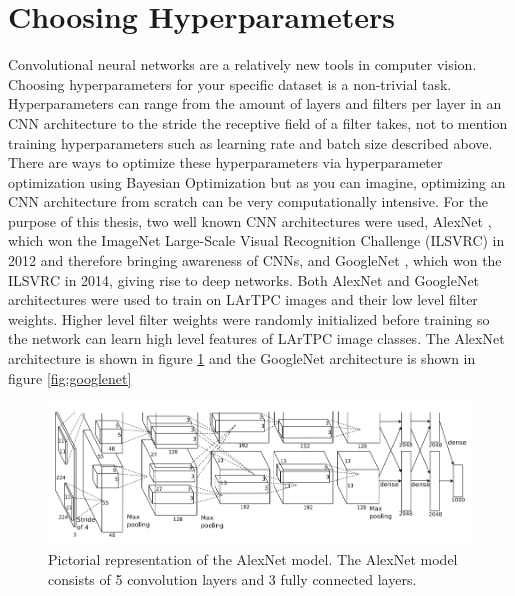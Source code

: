 \section{Choosing Hyperparameters}
Convolutional neural networks are a relatively new tools in computer vision. Choosing hyperparameters for your specific dataset is a non-trivial task. Hyperparameters can range from the amount of layers and filters per layer in an CNN architecture to the stride the receptive field of a filter takes, not to mention training hyperparameters such as learning rate and batch size described above. There are ways to optimize these hyperparameters via hyperparameter optimization using Bayesian Optimization \cite{optimization} but as you can imagine, optimizing an CNN architecture from scratch can be very computationally intensive. For the purpose of this thesis, two well known CNN architectures were used, AlexNet \cite{alexnet}, which won the ImageNet Large-Scale Visual Recognition Challenge (ILSVRC) in 2012 and therefore bringing awareness of CNNs, and GoogleNet \cite{googlenet}, which won the ILSVRC in 2014, giving rise to deep networks. Both AlexNet and GoogleNet architectures were used to train on LArTPC images and their low level filter weights. Higher level filter weights were randomly initialized before training so the network can learn high level features of LArTPC image classes. The AlexNet architecture is shown in figure \ref{fig:alexnet} and the GoogleNet architecture is shown in figure \ref{fig:googlenet}

\begin{figure}[htp!]
\centering
\includegraphics[width=0.9\linewidth]{figs/alexnet.png}
\caption{Pictorial representation of the AlexNet model. The AlexNet model consists of 5 convolution layers and 3 fully connected layers.}
\label{fig:alexnet}
\end{figure}

